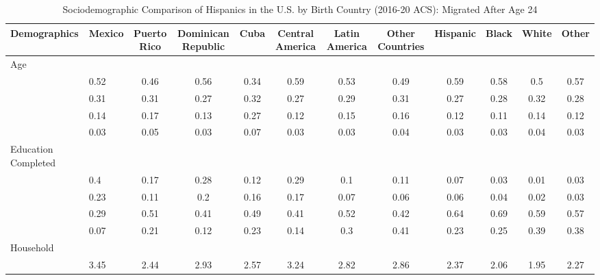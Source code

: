 \begin{table}[ht]
\centering
\caption{Sociodemographic Comparison of Hispanics in the U.S. by Birth Country (2016-20 ACS): Migrated After Age 24} 
\begingroup\small
\begin{tabular}{>{\raggedright\arraybackslash}p{3.2cm}|lcccccc|cccc}
  \hline
Demographics & Mexico & Puerto Rico & Dominican Republic & Cuba & Central America & Latin America & Other Countries & Hispanic & Black & White & Other \\ 
  \hline
Age &  &  &  &  &  &  &  &  &  &  &  \\ 
  \multicolumn{1}{>{\raggedleft\arraybackslash}p{1.5cm}|}{\makebox[1.5cm][r]{60 - 69 }}& 0.52 & 0.46 & 0.56 & 0.34 & 0.59 & 0.53 & 0.49 & 0.59 & 0.58 & 0.5 & 0.57 \\ 
  \multicolumn{1}{>{\raggedleft\arraybackslash}p{1.5cm}|}{\makebox[1.5cm][r]{70 - 79 }}& 0.31 & 0.31 & 0.27 & 0.32 & 0.27 & 0.29 & 0.31 & 0.27 & 0.28 & 0.32 & 0.28 \\ 
  \multicolumn{1}{>{\raggedleft\arraybackslash}p{1.5cm}|}{\makebox[1.5cm][r]{80 - 89 }}& 0.14 & 0.17 & 0.13 & 0.27 & 0.12 & 0.15 & 0.16 & 0.12 & 0.11 & 0.14 & 0.12 \\ 
  \multicolumn{1}{>{\raggedleft\arraybackslash}p{1.5cm}|}{\makebox[1.5cm][r]{90 plus }}& 0.03 & 0.05 & 0.03 & 0.07 & 0.03 & 0.03 & 0.04 & 0.03 & 0.03 & 0.04 & 0.03 \\ 
  Education Completed &  &  &  &  &  &  &  &  &  &  &  \\ 
  \multicolumn{1}{>{\raggedleft\arraybackslash}p{3.2cm}|}{\makebox[3.2cm][r]{Less than Primary }}& 0.4 & 0.17 & 0.28 & 0.12 & 0.29 & 0.1 & 0.11 & 0.07 & 0.03 & 0.01 & 0.03 \\ 
  \multicolumn{1}{>{\raggedleft\arraybackslash}p{1.7cm}|}{\makebox[1.7cm][r]{Primary }}& 0.23 & 0.11 & 0.2 & 0.16 & 0.17 & 0.07 & 0.06 & 0.06 & 0.04 & 0.02 & 0.03 \\ 
  \multicolumn{1}{>{\raggedleft\arraybackslash}p{2cm}|}{\makebox[2cm][r]{Secondary }}& 0.29 & 0.51 & 0.41 & 0.49 & 0.41 & 0.52 & 0.42 & 0.64 & 0.69 & 0.59 & 0.57 \\ 
  \multicolumn{1}{>{\raggedleft\arraybackslash}p{2cm}|}{\makebox[2cm][r]{University }}& 0.07 & 0.21 & 0.12 & 0.23 & 0.14 & 0.3 & 0.41 & 0.23 & 0.25 & 0.39 & 0.38 \\ 
  Household &  &  &  &  &  &  &  &  &  &  &  \\ 
  \multicolumn{1}{>{\raggedleft\arraybackslash}p{2.7cm}|}{\makebox[2.7cm][r]{Household Size }}& 3.45 & 2.44 & 2.93 & 2.57 & 3.24 & 2.82 & 2.86 & 2.37 & 2.06 & 1.95 & 2.27 \\ 

\end{tabular}
\end{table}
